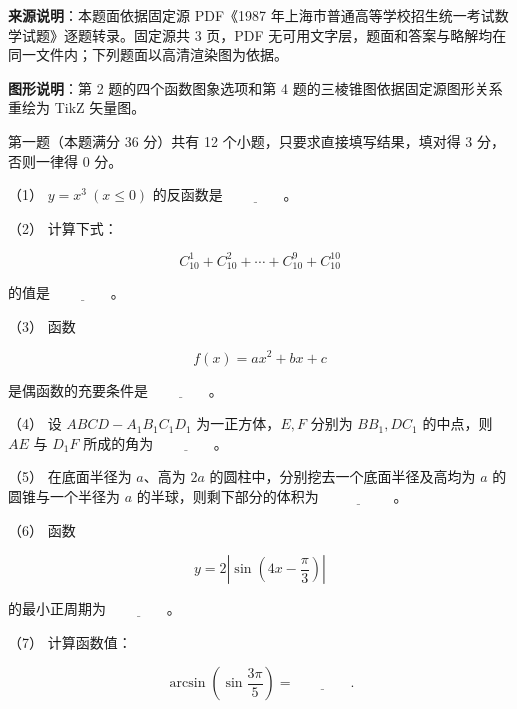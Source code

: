 

\begin{gktip}
\textbf{来源说明}：本题面依据固定源 PDF《1987 年上海市普通高等学校招生统一考试数学试题》逐题转录。固定源共 3 页，PDF 无可用文字层，题面和答案与略解均在同一文件内；下列题面以高清渲染图为依据。

\textbf{图形说明}：第 2 题的四个函数图象选项和第 4 题的三棱锥图依据固定源图形关系重绘为 TikZ 矢量图。
\end{gktip}

\begin{question}

第一题（本题满分 36 分）共有 12 个小题，只要求直接填写结果，填对得 3 分，否则一律得 0 分。

（1） $y=x^3\ (x\leq0)$ 的反函数是 $\underline{\hspace{4em}}$。

（2） 计算下式：

\nopagebreak[4]
\[
C_{10}^{1}+C_{10}^{2}+\cdots+C_{10}^{9}+C_{10}^{10}
\]

的值是 $\underline{\hspace{4em}}$。

（3） 函数

\nopagebreak[4]
\[
f(x)=ax^2+bx+c
\]

是偶函数的充要条件是 $\underline{\hspace{4em}}$。

（4） 设 $ABCD-A_1B_1C_1D_1$ 为一正方体，$E,F$ 分别为 $BB_1,DC_1$ 的中点，则 $AE$ 与 $D_1F$ 所成的角为 $\underline{\hspace{4em}}$。

（5） 在底面半径为 $a$、高为 $2a$ 的圆柱中，分别挖去一个底面半径及高均为 $a$ 的圆锥与一个半径为 $a$ 的半球，则剩下部分的体积为 $\underline{\hspace{5em}}$。

（6） 函数

\nopagebreak[4]
\[
y=2\left|\sin\left(4x-\frac\pi3\right)\right|
\]

的最小正周期为 $\underline{\hspace{4em}}$。

（7） 计算函数值：

\nopagebreak[4]
\[
\arcsin\left(\sin\frac{3\pi}{5}\right)=\underline{\hspace{4em}}.
\]


\end{question}
